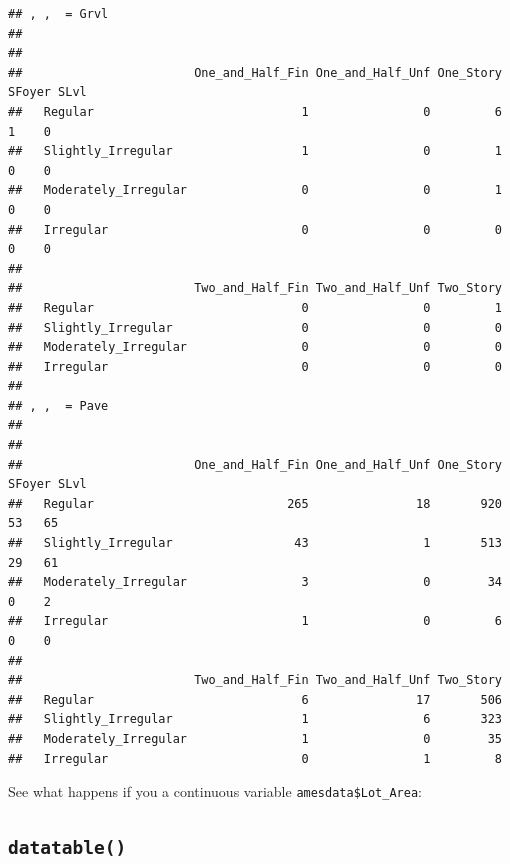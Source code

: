 \documentclass[
]{book}
\newenvironment{Shaded}{\begin{snugshade}}{\end{snugshade}}
\newcommand{\CommentTok}[1]{\textcolor[rgb]{0.56,0.35,0.01}{\textit{#1}}}
\begin{document}
\begin{verbatim}
## , ,  = Grvl
## 
##                       
##                        One_and_Half_Fin One_and_Half_Unf One_Story SFoyer SLvl
##   Regular                             1                0         6      1    0
##   Slightly_Irregular                  1                0         1      0    0
##   Moderately_Irregular                0                0         1      0    0
##   Irregular                           0                0         0      0    0
##                       
##                        Two_and_Half_Fin Two_and_Half_Unf Two_Story
##   Regular                             0                0         1
##   Slightly_Irregular                  0                0         0
##   Moderately_Irregular                0                0         0
##   Irregular                           0                0         0
## 
## , ,  = Pave
## 
##                       
##                        One_and_Half_Fin One_and_Half_Unf One_Story SFoyer SLvl
##   Regular                           265               18       920     53   65
##   Slightly_Irregular                 43                1       513     29   61
##   Moderately_Irregular                3                0        34      0    2
##   Irregular                           1                0         6      0    0
##                       
##                        Two_and_Half_Fin Two_and_Half_Unf Two_Story
##   Regular                             6               17       506
##   Slightly_Irregular                  1                6       323
##   Moderately_Irregular                1                0        35
##   Irregular                           0                1         8
\end{verbatim}

See what happens if you a continuous variable \texttt{amesdata\$Lot\_Area}:

\begin{Shaded}
\end{Shaded}

\hypertarget{datatable}{%
\subsection{\texorpdfstring{\texttt{datatable()}}{datatable()}}\label{datatable}}
\end{document}
